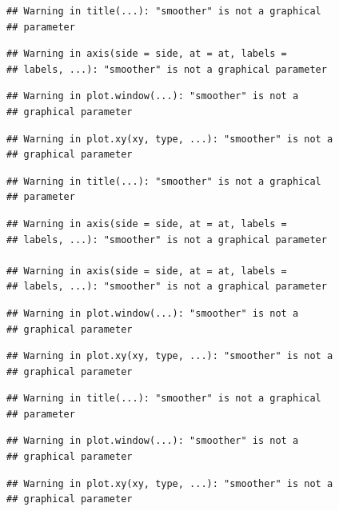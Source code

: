 \documentclass[12pt,]{krantz}
\begin{document}
\begin{verbatim}
## Warning in title(...): "smoother" is not a graphical
## parameter
\end{verbatim}

\begin{verbatim}
## Warning in axis(side = side, at = at, labels =
## labels, ...): "smoother" is not a graphical parameter
\end{verbatim}

\begin{verbatim}
## Warning in plot.window(...): "smoother" is not a
## graphical parameter
\end{verbatim}

\begin{verbatim}
## Warning in plot.xy(xy, type, ...): "smoother" is not a
## graphical parameter
\end{verbatim}

\begin{verbatim}
## Warning in title(...): "smoother" is not a graphical
## parameter
\end{verbatim}

\begin{verbatim}
## Warning in axis(side = side, at = at, labels =
## labels, ...): "smoother" is not a graphical parameter

## Warning in axis(side = side, at = at, labels =
## labels, ...): "smoother" is not a graphical parameter
\end{verbatim}

\begin{verbatim}
## Warning in plot.window(...): "smoother" is not a
## graphical parameter
\end{verbatim}

\begin{verbatim}
## Warning in plot.xy(xy, type, ...): "smoother" is not a
## graphical parameter
\end{verbatim}

\begin{verbatim}
## Warning in title(...): "smoother" is not a graphical
## parameter
\end{verbatim}

\begin{verbatim}
## Warning in plot.window(...): "smoother" is not a
## graphical parameter
\end{verbatim}

\begin{verbatim}
## Warning in plot.xy(xy, type, ...): "smoother" is not a
## graphical parameter
\end{verbatim}
\end{document}
